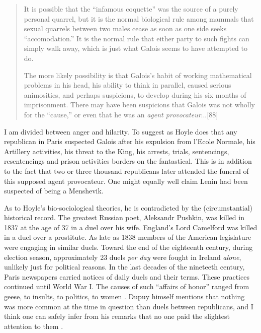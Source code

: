 \documentclass[12pt]{article}
\begin{document}
\begin{quotation}
It is possible that the ``infamous coquette'' was the source of a purely personal quarrel, but it is the normal biological rule among mammals that sexual quarrels between two males cease as soon as one side seeks ``accomodation.'' It is the normal rule that either party to such fights can simply walk away, which is just what Galois seems to have attempted to do. 

The more likely possibility is that Galois's habit of working mathematical problems in his head, his ability to think in parallel, caused serious animosities, and perhaps suspicions, to develop during his six months of imprisonment. There may have been suspicions that Galois was not wholly for the ``cause,'' or even that he was an {\it agent provocateur}...[88]
\end{quotation}
I am divided between anger and hilarity. To suggest as Hoyle does that any republican in Paris suspected Galois after his expulsion from l'Ecole Normale, his Artillery activities, his threat to the King, his arrests, trials, sentencings, resentencings and prison activities borders on the fantastical. This is in addition to the fact that two or three thousand republicans later attended the funeral of this supposed agent provocateur. One might equally well claim Lenin had been suspected of being a Menshevik.

As to Hoyle's bio-sociological theories, he is contradicted by the (circumstantial) historical record. The greatest Russian poet, Aleksandr Pushkin, was killed in 1837 at the age of 37 in a duel over his wife. England's Lord Camelford was killed in a duel over a prostitute. As late as 1838 members of the American legislature were engaging in similar duels. Toward the end of the eighteenth century, during election season, approximately 23 duels \emph{per day }were fought in Ireland {\it alone}, unlikely just for political reasons. In the last decades of the nineteeth century, Paris newspapers carried notices of daily duels and their terms. These practices continued until World War I. The causes of such ``affairs of honor'' ranged from geese, to insults, to politics, to women \cite{89}. Dupuy himself mentions that nothing was more common at the time in question than duels between republicans, and I think one can safely infer from his remarks that no one paid the slightest attention to them \cite{90}.
\end{document}
